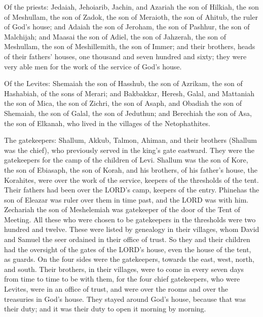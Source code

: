  Of the priests: Jedaiah, Jehoiarib, Jachin, 
and Azariah the son of Hilkiah, the son of Meshullam, the son of Zadok,
the son of Meraioth, the son of Ahitub, the ruler of God's house;
 and Adaiah the son of Jeroham, the son of Pashhur, the son
of Malchijah; and Maasai the son of Adiel, the son of Jahzerah, the son
of Meshullam, the son of Meshillemith, the son of Immer; 
and their brothers, heads of their fathers' houses, one thousand and
seven hundred and sixty; they were very able men for the work of the
service of God's house.

 Of the Levites: Shemaiah the son of Hasshub, the son of
Azrikam, the son of Hashabiah, of the sons of Merari;  and
Bakbakkar, Heresh, Galal, and Mattaniah the son of Mica, the son of
Zichri, the son of Asaph,  and Obadiah the son of Shemaiah,
the son of Galal, the son of Jeduthun; and Berechiah the son of Asa, the
son of Elkanah, who lived in the villages of the Netophathites.

 The gatekeepers: Shallum, Akkub, Talmon, Ahiman, and their
brothers (Shallum was the chief),  who previously served in
the king's gate eastward. They were the gatekeepers for the camp of the
children of Levi.  Shallum was the son of Kore, the son of
Ebiasaph, the son of Korah, and his brothers, of his father's house, the
Korahites, were over the work of the service, keepers of the thresholds
of the tent. Their fathers had been over the LORD's camp, keepers of the
entry.  Phinehas the son of Eleazar was ruler over them in
time past, and the LORD was with him.  Zechariah the son of
Meshelemiah was gatekeeper of the door of the Tent of Meeting.
 All these who were chosen to be gatekeepers in the
thresholds were two hundred and twelve. These were listed by genealogy
in their villages, whom David and Samuel the seer ordained in their
office of trust.  So they and their children had the
oversight of the gates of the LORD's house, even the house of the tent,
as guards.  On the four sides were the gatekeepers, towards
the east, west, north, and south.  Their brothers, in their
villages, were to come in every seven days from time to time to be with
them,  for the four chief gatekeepers, who were Levites,
were in an office of trust, and were over the rooms and over the
treasuries in God's house.  They stayed around God's house,
because that was their duty; and it was their duty to open it morning by
morning.


